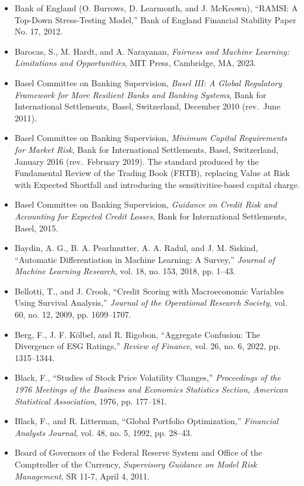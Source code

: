 \documentclass{book}
\begin{document}
\begin{itemize}
    \item Bank of England (O. Burrows, D. Learmonth, and J. McKeown), ``RAMSI: A Top-Down Stress-Testing Model,'' Bank of England Financial Stability Paper No. 17, 2012.
    \item Barocas, S., M. Hardt, and A. Narayanan, \emph{Fairness and Machine Learning: Limitations and Opportunities}, MIT Press, Cambridge, MA, 2023.
    \item Basel Committee on Banking Supervision, \emph{Basel III: A Global Regulatory Framework for More Resilient Banks and Banking Systems}, Bank for International Settlements, Basel, Switzerland, December 2010 (rev.\ June 2011).
    \item Basel Committee on Banking Supervision, \emph{Minimum Capital Requirements for Market Risk}, Bank for International Settlements, Basel, Switzerland, January 2016 (rev.\ February 2019). The standard produced by the Fundamental Review of the Trading Book (FRTB), replacing Value at Risk with Expected Shortfall and introducing the sensitivities-based capital charge.
    \item Basel Committee on Banking Supervision, \emph{Guidance on Credit Risk and Accounting for Expected Credit Losses}, Bank for International Settlements, Basel, 2015.
    \item Baydin, A. G., B. A. Pearlmutter, A. A. Radul, and J. M. Siskind, ``Automatic Differentiation in Machine Learning: A Survey,'' \emph{Journal of Machine Learning Research}, vol. 18, no. 153, 2018, pp. 1--43.
    \item Bellotti, T., and J. Crook, ``Credit Scoring with Macroeconomic Variables Using Survival Analysis,'' \emph{Journal of the Operational Research Society}, vol. 60, no. 12, 2009, pp. 1699--1707.
    \item Berg, F., J. F. Kölbel, and R. Rigobon, ``Aggregate Confusion: The Divergence of ESG Ratings,'' \emph{Review of Finance}, vol. 26, no. 6, 2022, pp. 1315--1344.
    \item Black, F., ``Studies of Stock Price Volatility Changes,'' \emph{Proceedings of the 1976 Meetings of the Business and Economics Statistics Section, American Statistical Association}, 1976, pp. 177--181.
    \item Black, F., and R. Litterman, ``Global Portfolio Optimization,'' \emph{Financial Analysts Journal}, vol. 48, no. 5, 1992, pp. 28--43.
    \item Board of Governors of the Federal Reserve System and Office of the Comptroller of the Currency, \emph{Supervisory Guidance on Model Risk Management}, SR 11-7, April 4, 2011.

\end{itemize}
\end{document}

